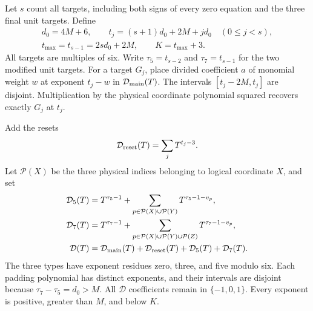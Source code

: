 Let $s$ count all targets, including both signs of every zero
equation and the three final unit targets. Define
\begin{equation}\label{eq:affine-radix-support}
 \begin{gathered}
 d_0=4M+6,\qquad
 t_j=(s+1)d_0+2M+jd_0\quad(0\le j<s),\\
 t_{\max}=t_{s-1}=2sd_0+2M,\qquad K=t_{\max}+3.
 \end{gathered}
\end{equation}
All targets are multiples of six. Write
$\tau_5=t_{s-2}$ and $\tau_7=t_{s-1}$ for the two modified
unit targets. For a target $G_j$, place divided coefficient $a$
of monomial weight $w$ at exponent $t_j-w$ in
$\mathcal D_{\rm main}(T)$. The intervals $[t_j-2M,t_j]$
are disjoint. Multiplication by the physical coordinate
polynomial squared recovers exactly $G_j$ at $t_j$.

Add the resets
\begin{equation}\label{eq:affine-radix-resets}
 \mathcal D_{\rm reset}(T)=\sum_j T^{t_j-3}.
\end{equation}
Let $\mathcal P(X)$ be the three physical indices belonging to
logical coordinate $X$, and set
\begin{equation}\label{eq:affine-radix-padding}
 \begin{aligned}
 \mathcal D_5(T)&=T^{\tau_5-1}
       +\sum_{p\in\mathcal P(X)\cup\mathcal P(Y)}
                                      T^{\tau_5-1-v_p},\\
 \mathcal D_7(T)&=T^{\tau_7-1}
       +\sum_{p\in\mathcal P(X)\cup\mathcal P(Y)\cup\mathcal P(Z)}
                                      T^{\tau_7-1-v_p},\\
 \mathcal D(T)&=\mathcal D_{\rm main}(T)
       +\mathcal D_{\rm reset}(T)+\mathcal D_5(T)+\mathcal D_7(T).
 \end{aligned}
\end{equation}
The three types have exponent residues zero, three, and five
modulo six. Each padding polynomial has distinct exponents, and
their intervals are disjoint because $\tau_7-\tau_5=d_0>M$.
All $\mathcal D$ coefficients remain in $\{-1,0,1\}$.
Every exponent is positive, greater than $M$, and below $K$.

